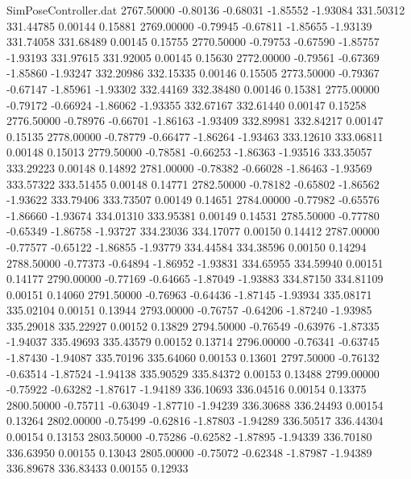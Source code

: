 \begin{filecontents}{SimPoseController.dat}
2767.50000   -0.80136   -0.68031    -1.85552   -1.93084  331.50312  331.44785    0.00144    0.15881
2769.00000   -0.79945   -0.67811    -1.85655   -1.93139  331.74058  331.68489    0.00145    0.15755
2770.50000   -0.79753   -0.67590    -1.85757   -1.93193  331.97615  331.92005    0.00145    0.15630
2772.00000   -0.79561   -0.67369    -1.85860   -1.93247  332.20986  332.15335    0.00146    0.15505
2773.50000   -0.79367   -0.67147    -1.85961   -1.93302  332.44169  332.38480    0.00146    0.15381
2775.00000   -0.79172   -0.66924    -1.86062   -1.93355  332.67167  332.61440    0.00147    0.15258
2776.50000   -0.78976   -0.66701    -1.86163   -1.93409  332.89981  332.84217    0.00147    0.15135
2778.00000   -0.78779   -0.66477    -1.86264   -1.93463  333.12610  333.06811    0.00148    0.15013
2779.50000   -0.78581   -0.66253    -1.86363   -1.93516  333.35057  333.29223    0.00148    0.14892
2781.00000   -0.78382   -0.66028    -1.86463   -1.93569  333.57322  333.51455    0.00148    0.14771
2782.50000   -0.78182   -0.65802    -1.86562   -1.93622  333.79406  333.73507    0.00149    0.14651
2784.00000   -0.77982   -0.65576    -1.86660   -1.93674  334.01310  333.95381    0.00149    0.14531
2785.50000   -0.77780   -0.65349    -1.86758   -1.93727  334.23036  334.17077    0.00150    0.14412
2787.00000   -0.77577   -0.65122    -1.86855   -1.93779  334.44584  334.38596    0.00150    0.14294
2788.50000   -0.77373   -0.64894    -1.86952   -1.93831  334.65955  334.59940    0.00151    0.14177
2790.00000   -0.77169   -0.64665    -1.87049   -1.93883  334.87150  334.81109    0.00151    0.14060
2791.50000   -0.76963   -0.64436    -1.87145   -1.93934  335.08171  335.02104    0.00151    0.13944
2793.00000   -0.76757   -0.64206    -1.87240   -1.93985  335.29018  335.22927    0.00152    0.13829
2794.50000   -0.76549   -0.63976    -1.87335   -1.94037  335.49693  335.43579    0.00152    0.13714
2796.00000   -0.76341   -0.63745    -1.87430   -1.94087  335.70196  335.64060    0.00153    0.13601
2797.50000   -0.76132   -0.63514    -1.87524   -1.94138  335.90529  335.84372    0.00153    0.13488
2799.00000   -0.75922   -0.63282    -1.87617   -1.94189  336.10693  336.04516    0.00154    0.13375
2800.50000   -0.75711   -0.63049    -1.87710   -1.94239  336.30688  336.24493    0.00154    0.13264
2802.00000   -0.75499   -0.62816    -1.87803   -1.94289  336.50517  336.44304    0.00154    0.13153
2803.50000   -0.75286   -0.62582    -1.87895   -1.94339  336.70180  336.63950    0.00155    0.13043
2805.00000   -0.75072   -0.62348    -1.87987   -1.94389  336.89678  336.83433    0.00155    0.12933

\end{filecontents}
